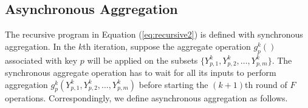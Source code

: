 
\subsection{Asynchronous Aggregation}
\label{sec:async:async}

The recursive program in Equation (\ref{eq:recursive2}) is defined with synchronous aggregation. In the $k$th iteration, suppose the aggregate operation $g_{p}^k()$ associated with key $p$ will be applied on the subsets $\{Y_{p,1}^k,Y_{p,2}^k,\ldots,Y_{p,m}^k\}$. The synchronous aggregate operation has to wait for all its inputs to perform aggregation $g_{p}^k(Y_{p,1}^k,Y_{p,2}^k,\ldots,Y_{p,m}^k)$ before starting the $(k+1)$th round of $F$ operations. Correspondingly, we define asynchronous aggregation as follows.


